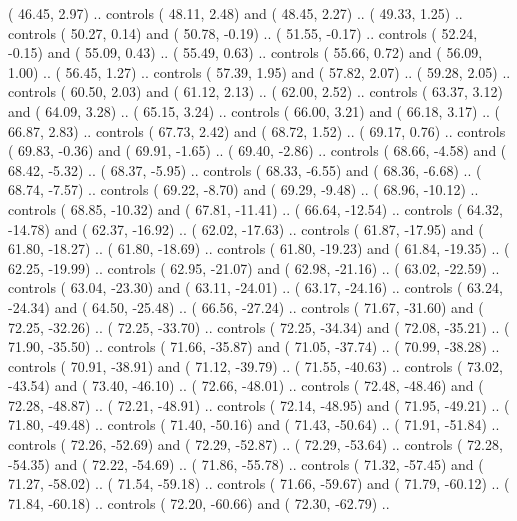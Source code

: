 {        (  46.45,   2.97) .. controls (  48.11,   2.48) and (  48.45,   2.27) ..
        (  49.33,   1.25) .. controls (  50.27,   0.14) and (  50.78,  -0.19) ..
        (  51.55,  -0.17) .. controls (  52.24,  -0.15) and (  55.09,   0.43) ..
        (  55.49,   0.63) .. controls (  55.66,   0.72) and (  56.09,   1.00) ..
        (  56.45,   1.27) .. controls (  57.39,   1.95) and (  57.82,   2.07) ..
        (  59.28,   2.05) .. controls (  60.50,   2.03) and (  61.12,   2.13) ..
        (  62.00,   2.52) .. controls (  63.37,   3.12) and (  64.09,   3.28) ..
        (  65.15,   3.24) .. controls (  66.00,   3.21) and (  66.18,   3.17) ..
        (  66.87,   2.83) .. controls (  67.73,   2.42) and (  68.72,   1.52) ..
        (  69.17,   0.76) .. controls (  69.83,  -0.36) and (  69.91,  -1.65) ..
        (  69.40,  -2.86) .. controls (  68.66,  -4.58) and (  68.42,  -5.32) ..
        (  68.37,  -5.95) .. controls (  68.33,  -6.55) and (  68.36,  -6.68) ..
        (  68.74,  -7.57) .. controls (  69.22,  -8.70) and (  69.29,  -9.48) ..
        (  68.96, -10.12) .. controls (  68.85, -10.32) and (  67.81, -11.41) ..
        (  66.64, -12.54) .. controls (  64.32, -14.78) and (  62.37, -16.92) ..
        (  62.02, -17.63) .. controls (  61.87, -17.95) and (  61.80, -18.27) ..
        (  61.80, -18.69) .. controls (  61.80, -19.23) and (  61.84, -19.35) ..
        (  62.25, -19.99) .. controls (  62.95, -21.07) and (  62.98, -21.16) ..
        (  63.02, -22.59) .. controls (  63.04, -23.30) and (  63.11, -24.01) ..
        (  63.17, -24.16) .. controls (  63.24, -24.34) and (  64.50, -25.48) ..
        (  66.56, -27.24) .. controls (  71.67, -31.60) and (  72.25, -32.26) ..
        (  72.25, -33.70) .. controls (  72.25, -34.34) and (  72.08, -35.21) ..
        (  71.90, -35.50) .. controls (  71.66, -35.87) and (  71.05, -37.74) ..
        (  70.99, -38.28) .. controls (  70.91, -38.91) and (  71.12, -39.79) ..
        (  71.55, -40.63) .. controls (  73.02, -43.54) and (  73.40, -46.10) ..
        (  72.66, -48.01) .. controls (  72.48, -48.46) and (  72.28, -48.87) ..
        (  72.21, -48.91) .. controls (  72.14, -48.95) and (  71.95, -49.21) ..
        (  71.80, -49.48) .. controls (  71.40, -50.16) and (  71.43, -50.64) ..
        (  71.91, -51.84) .. controls (  72.26, -52.69) and (  72.29, -52.87) ..
        (  72.29, -53.64) .. controls (  72.28, -54.35) and (  72.22, -54.69) ..
        (  71.86, -55.78) .. controls (  71.32, -57.45) and (  71.27, -58.02) ..
        (  71.54, -59.18) .. controls (  71.66, -59.67) and (  71.79, -60.12) ..
        (  71.84, -60.18) .. controls (  72.20, -60.66) and (  72.30, -62.79) ..
}
